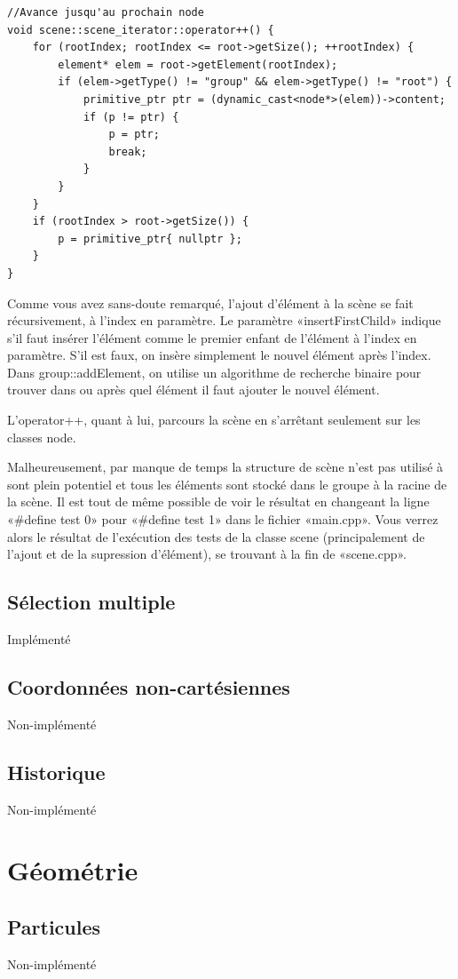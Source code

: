 \begin{lstlisting}
//Avance jusqu'au prochain node
void scene::scene_iterator::operator++() {
	for (rootIndex; rootIndex <= root->getSize(); ++rootIndex) {
		element* elem = root->getElement(rootIndex);
		if (elem->getType() != "group" && elem->getType() != "root") {
			primitive_ptr ptr = (dynamic_cast<node*>(elem))->content;
			if (p != ptr) {
				p = ptr;
				break;
			}
		}
	}
	if (rootIndex > root->getSize()) {
		p = primitive_ptr{ nullptr };
	}
}
\end{lstlisting}
Comme vous avez sans-doute remarqué, l'ajout d'élément à la scène se fait récursivement, à l'index en paramètre. Le paramètre «insertFirstChild» indique s'il faut insérer l'élément comme le premier enfant de l'élément à l'index en paramètre. S'il est faux, on insère simplement le nouvel élément après l'index. Dans group::addElement, on utilise un algorithme de recherche binaire pour trouver dans ou après quel élément il faut ajouter le nouvel élément.

L'operator++, quant à lui, parcours la scène en s'arrêtant seulement sur les classes node.  

Malheureusement, par manque de temps la structure de scène n'est pas utilisé à sont plein potentiel et tous les éléments sont stocké dans le groupe à la racine de la scène. Il est tout de même possible de voir le résultat en changeant la ligne «\#define test 0» pour «\#define test 1» dans le fichier «main.cpp». Vous verrez alors le résultat de l'exécution des tests de la classe scene (principalement de l'ajout et de la supression d'élément), se trouvant à la fin de «scene.cpp». 

\subsection{Sélection multiple}
Implémenté

\subsection{Coordonnées non-cartésiennes}
Non-implémenté

\subsection{Historique}
Non-implémenté

\section{Géométrie}
\subsection{Particules}
Non-implémenté

